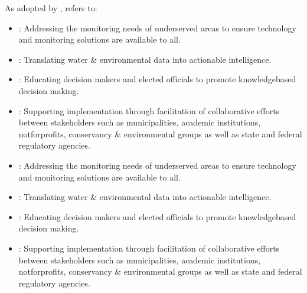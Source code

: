 \documentclass[letterpaper,10pt,english]{sphinxmanual}
\begin{document}
\sphinxAtStartPar
As adopted by ,  refers to:
\begin{itemize}
\item {} 
\sphinxAtStartPar
{}: Addressing the monitoring needs of under\sphinxhyphen{}served areas to ensure technology and monitoring solutions are available to all.

\item {} 
\sphinxAtStartPar
{}: Translating water \& environmental data into actionable intelligence.

\item {} 
\sphinxAtStartPar
{}: Educating decision makers and elected officials to promote knowledge\sphinxhyphen{}based decision making.

\item {} 
\sphinxAtStartPar
{}: Supporting implementation through facilitation of collaborative efforts between stakeholders such as municipalities, academic institutions, not\sphinxhyphen{}for\sphinxhyphen{}profits, conservancy \& environmental groups as well as state and federal regulatory agencies.

\end{itemize}
\begin{itemize}
\item {} 
\sphinxAtStartPar
{}: Addressing the monitoring needs of under\sphinxhyphen{}served areas to ensure technology and monitoring solutions are available to all.

\item {} 
\sphinxAtStartPar
{}: Translating water \& environmental data into actionable intelligence.

\item {} 
\sphinxAtStartPar
{}: Educating decision makers and elected officials to promote knowledge\sphinxhyphen{}based decision making.

\item {} 
\sphinxAtStartPar
{}: Supporting implementation through facilitation of collaborative efforts between stakeholders such as municipalities, academic institutions, not\sphinxhyphen{}for\sphinxhyphen{}profits, conservancy \& environmental groups as well as state and federal regulatory agencies.

\end{itemize}
\end{document}
